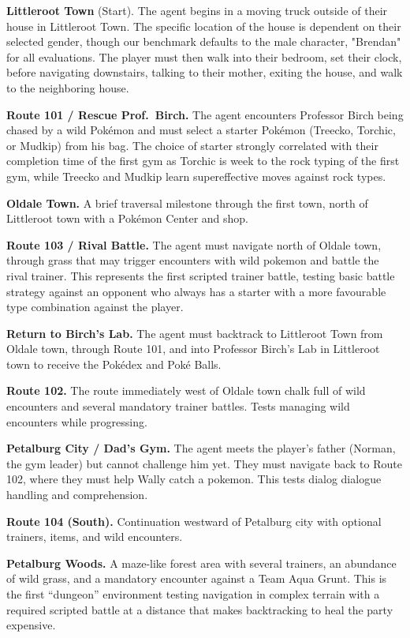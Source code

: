\textbf{Littleroot Town} (Start). The agent begins in a moving truck outside of their house in Littleroot Town. The specific location of the house is dependent on their selected gender, though our benchmark defaults to the male character, "Brendan" for all evaluations. The player must then walk into their bedroom, set their clock, before navigating downstairs, talking to their mother, exiting the house, and walk to the neighboring house.

\textbf{Route 101 / Rescue Prof.\ Birch.} The agent encounters Professor Birch being chased by a wild Pok\'{e}mon and must select a starter Pok\'{e}mon (Treecko, Torchic, or Mudkip) from his bag. The choice of starter strongly correlated with their completion time of the first gym as Torchic is week to the rock typing of the first gym, while Treecko and Mudkip learn supereffective moves against rock types.

\textbf{Oldale Town.} A brief traversal milestone through the first town, north of Littleroot town with a Pok\'{e}mon Center and shop.

\textbf{Route 103 / Rival Battle.} The agent must navigate north of Oldale town, through grass that may trigger encounters with wild pokemon and battle the rival trainer. This represents the first scripted trainer battle, testing basic battle strategy against an opponent who always has a starter with a more favourable type combination against the player.

\textbf{Return to Birch's Lab.} The agent must backtrack to Littleroot Town from Oldale town, through Route 101, and into Professor Birch's Lab in Littleroot town to receive the Pok\'{e}dex and Pok\'{e} Balls. 

\textbf{Route 102.} The route immediately west of Oldale town chalk full of wild encounters and several mandatory trainer battles. Tests managing wild encounters while progressing.

\textbf{Petalburg City / Dad's Gym.} The agent meets the player's father (Norman, the gym leader) but cannot challenge him yet. They must navigate back to Route 102, where they must help Wally catch a pokemon. This tests dialog dialogue handling and comprehension.

\textbf{Route 104 (South).} Continuation westward of Petalburg city with optional trainers, items, and wild encounters.

\textbf{Petalburg Woods.} A maze-like forest area with several trainers, an abundance of wild grass, and a mandatory encounter against a Team Aqua Grunt. This is the first ``dungeon'' environment testing navigation in complex terrain with a required scripted battle at a distance that makes backtracking to heal the party expensive.


